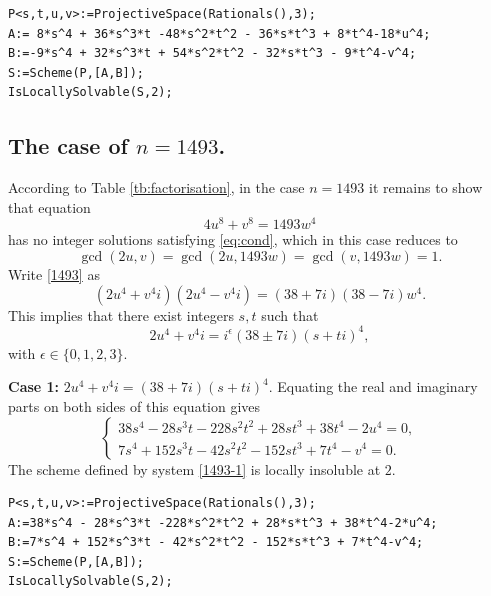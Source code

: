 \documentclass[a4paper,12pt,english,reqno]{amsart}
\begin{document}
\begin{lstlisting}
P<s,t,u,v>:=ProjectiveSpace(Rationals(),3);
A:= 8*s^4 + 36*s^3*t -48*s^2*t^2 - 36*s*t^3 + 8*t^4-18*u^4;
B:=-9*s^4 + 32*s^3*t + 54*s^2*t^2 - 32*s*t^3 - 9*t^4-v^4;
S:=Scheme(P,[A,B]);
IsLocallySolvable(S,2);
\end{lstlisting}


\subsection{The case of $n=1493$.}%
According to Table \ref{tb:factorisation}, in the case $n=1493$ it remains to
show that equation
\begin{equation}\label{1493}
4u^8+v^8=1493w^4
\end{equation}
has no integer solutions satisfying \eqref{eq:cond}, which in this case reduces to \[\gcd(2u,v)=\gcd(2u,1493w)=\gcd(v,1493w)=1.\]  Write \eqref{1493} as
\begin{equation}\label{1493.1} (2u^4+v^4i)(2u^4-v^4i)=(38+7i)(38-7i)w^4.
\end{equation}
This implies that there exist integers $s,t$ such that 
\[2u^4+v^4i=i^{\epsilon}(38\pm 7i)(s+ti)^4,\]
with $\epsilon \in \{0,1,2,3\}$.


{\bf Case 1:} $2u^4+v^4i=(38+7i)(s+ti)^4$. Equating the real and imaginary parts on both sides of this equation gives
\begin{equation}\label{1493-1}
\begin{cases}
38s^4 - 28s^3t - 228s^2t^2 + 28st^3 + 38t^4 - 2u^4=0,\\
7s^4 + 152s^3t - 42s^2t^2 - 152st^3 + 7t^4 - v^4=0.
\end{cases}
\end{equation}
The scheme defined by system \eqref{1493-1} is locally insoluble at $2$.


\begin{lstlisting}
P<s,t,u,v>:=ProjectiveSpace(Rationals(),3);
A:=38*s^4 - 28*s^3*t -228*s^2*t^2 + 28*s*t^3 + 38*t^4-2*u^4;
B:=7*s^4 + 152*s^3*t - 42*s^2*t^2 - 152*s*t^3 + 7*t^4-v^4;
S:=Scheme(P,[A,B]);
IsLocallySolvable(S,2);
\end{lstlisting}
\end{document}

